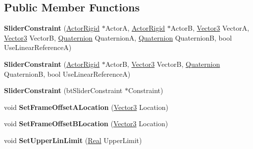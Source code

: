 \subsection*{Public Member Functions}
\begin{DoxyCompactItemize}
\item 
\hypertarget{classphys_1_1SliderConstraint_a012329e9d8125ff030c6351045f0f97b}{
{\bfseries SliderConstraint} (\hyperlink{classphys_1_1ActorRigid}{ActorRigid} $\ast$ActorA, \hyperlink{classphys_1_1ActorRigid}{ActorRigid} $\ast$ActorB, \hyperlink{classphys_1_1Vector3}{Vector3} VectorA, \hyperlink{classphys_1_1Vector3}{Vector3} VectorB, \hyperlink{classphys_1_1Quaternion}{Quaternion} QuaternionA, \hyperlink{classphys_1_1Quaternion}{Quaternion} QuaternionB, bool UseLinearReferenceA)}
\label{dc/d72/classphys_1_1SliderConstraint_a012329e9d8125ff030c6351045f0f97b}

\item 
\hypertarget{classphys_1_1SliderConstraint_a4727dc39e3ac0ab553aa6a1cff00fc4e}{
{\bfseries SliderConstraint} (\hyperlink{classphys_1_1ActorRigid}{ActorRigid} $\ast$ActorB, \hyperlink{classphys_1_1Vector3}{Vector3} VectorB, \hyperlink{classphys_1_1Quaternion}{Quaternion} QuaternionB, bool UseLinearReferenceA)}
\label{dc/d72/classphys_1_1SliderConstraint_a4727dc39e3ac0ab553aa6a1cff00fc4e}

\item 
\hypertarget{classphys_1_1SliderConstraint_a142708184f0a445edadddc4ad5ca08b5}{
{\bfseries SliderConstraint} (btSliderConstraint $\ast$Constraint)}
\label{dc/d72/classphys_1_1SliderConstraint_a142708184f0a445edadddc4ad5ca08b5}

\item 
\hypertarget{classphys_1_1SliderConstraint_a815265abaf184340aef505eaf82775e2}{
void {\bfseries SetFrameOffsetALocation} (\hyperlink{classphys_1_1Vector3}{Vector3} Location)}
\label{dc/d72/classphys_1_1SliderConstraint_a815265abaf184340aef505eaf82775e2}

\item 
\hypertarget{classphys_1_1SliderConstraint_a828eb0ffac6d95ce2d8d9690a12ca722}{
void {\bfseries SetFrameOffsetBLocation} (\hyperlink{classphys_1_1Vector3}{Vector3} Location)}
\label{dc/d72/classphys_1_1SliderConstraint_a828eb0ffac6d95ce2d8d9690a12ca722}

\item 
\hypertarget{classphys_1_1SliderConstraint_a52489284afda499982707f712db6ed99}{
void {\bfseries SetUpperLinLimit} (\hyperlink{namespacephys_af7eb897198d265b8e868f45240230d5f}{Real} UpperLimit)}
\label{dc/d72/classphys_1_1SliderConstraint_a52489284afda499982707f712db6ed99}


\end{DoxyCompactItemize}
